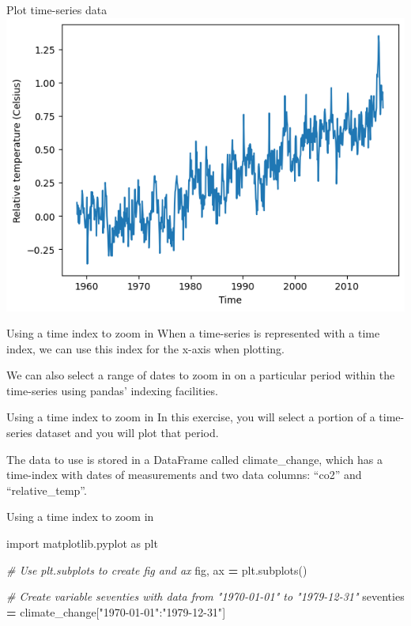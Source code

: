 \documentclass[
  ignorenonframetext,
]{beamer}
\newenvironment{Shaded}{\begin{snugshade}}{\end{snugshade}}
\newcommand{\CommentTok}[1]{\textcolor[rgb]{0.56,0.35,0.01}{\textit{#1}}}
\newcommand{\ImportTok}[1]{#1}
\newcommand{\NormalTok}[1]{#1}
\newcommand{\OperatorTok}[1]{\textcolor[rgb]{0.81,0.36,0.00}{\textbf{#1}}}
\newcommand{\StringTok}[1]{\textcolor[rgb]{0.31,0.60,0.02}{#1}}
\begin{document}
\begin{frame}{Plot time-series data}
\label{plot-time-series-data-5}
\includegraphics{../images/im233.png}
\end{frame}

\begin{frame}{Using a time index to zoom in}
\label{using-a-time-index-to-zoom-in}
When a time-series is represented with a time index, we can use this
index for the x-axis when plotting.

We can also select a range of dates to zoom in on a particular period
within the time-series using pandas' indexing facilities.
\end{frame}

\begin{frame}{Using a time index to zoom in}
\label{using-a-time-index-to-zoom-in-1}
In this exercise, you will select a portion of a time-series dataset and
you will plot that period.

The data to use is stored in a DataFrame called climate\_change, which
has a time-index with dates of measurements and two data columns:
``co2'' and ``relative\_temp''.
\end{frame}

\begin{frame}[fragile]{Using a time index to zoom in}
\label{using-a-time-index-to-zoom-in-2}

\begin{Shaded}
\begin{Highlighting}[]
\ImportTok{import}\NormalTok{ matplotlib.pyplot }\ImportTok{as}\NormalTok{ plt}

\CommentTok{\# Use plt.subplots to create fig and ax}
\NormalTok{fig, ax }\OperatorTok{=}\NormalTok{ plt.subplots()}

\CommentTok{\# Create variable seventies with data from "1970{-}01{-}01" to "1979{-}12{-}31"}
\NormalTok{seventies }\OperatorTok{=}\NormalTok{ climate\_change[}\StringTok{"1970{-}01{-}01"}\NormalTok{:}\StringTok{"1979{-}12{-}31"}\NormalTok{]}
\end{Highlighting}
\end{Shaded}
\end{frame}
\end{document}
